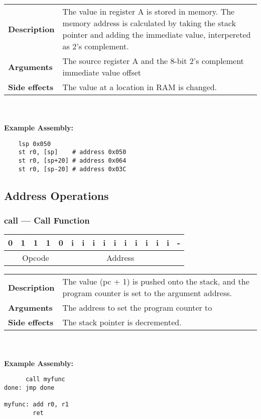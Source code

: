 \documentclass[titlepage]{article}
\begin{document}
\begin{tabular}{l p{8cm}}
{\bf Description} & The value in register A is stored in memory. The memory address is calculated by taking the stack pointer and adding the immediate value, interpereted as 2's complement. \\
{\bf Arguments} & The source register A and the 8-bit 2's complement immediate value offset \\
{\bf Side effects} & The value at a location in RAM is changed. \\
\end{tabular}\\ \\
{\bf Example Assembly:}
\begin{verbatim}
    lsp 0x050
    st r0, [sp]    # address 0x050
    st r0, [sp+20] # address 0x064
    st r0, [sp-20] # address 0x03C
\end{verbatim}

\subsection{Address Operations}

\subsubsection{call --- Call Function}\begin{center}
\begin{tabular}{|c|c|c|c|c|c|c|c|c|c|c|c|c|c|c|c|}
\hline
0 & 1 & 1 & 1 & 0 & i & i & i & i & i & i & i & i & i & i & - \\
\hline
\multicolumn{5}{|c}{Opcode} &
\multicolumn{10}{|c}{Address} &
\multicolumn{1}{|c|}{} \\
\hline
\end{tabular}
\end{center}

\begin{tabular}{l p{8cm}}
{\bf Description} & The value (pc + 1) is pushed onto the stack, and the program counter is set to the argument address.  \\
{\bf Arguments} & The address to set the program counter to \\
{\bf Side effects} & The stack pointer is decremented. \\
\end{tabular}\\ \\
{\bf Example Assembly:}
\begin{verbatim}
      call myfunc
done: jmp done

myfunc: add r0, r1
        ret
\end{verbatim}
\end{document}
